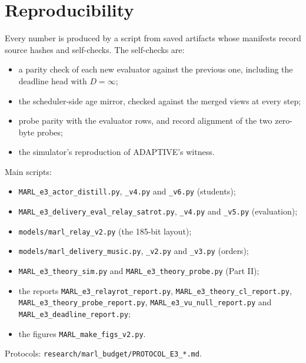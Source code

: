 \documentclass[11pt]{article}
\theoremstyle{definition}
\begin{document}
\section{Reproducibility}
Every number is produced by a script from saved artifacts whose manifests record source hashes and self-checks. The
self-checks are:
\begin{itemize}
\item a parity check of each new evaluator against the previous one, including the deadline head with $D=\infty$;
\item the scheduler-side age mirror, checked against the merged views at every step;
\item probe parity with the evaluator rows, and record alignment of the two zero-byte probes;
\item the simulator's reproduction of ADAPTIVE's witness.
\end{itemize}
Main scripts:
\begin{itemize}
\item \texttt{MARL\_e3\_actor\_distill.py}, \texttt{\_v4.py} and \texttt{\_v6.py} (students);
\item \texttt{MARL\_e3\_delivery\_eval\_relay\_satrot.py}, \texttt{\_v4.py} and \texttt{\_v5.py} (evaluation);
\item \texttt{models/marl\_relay\_v2.py} (the 185-bit layout);
\item \texttt{models/marl\_delivery\_music.py}, \texttt{\_v2.py} and \texttt{\_v3.py} (orders);
\item \texttt{MARL\_e3\_theory\_sim.py} and \texttt{MARL\_e3\_theory\_probe.py} (Part II);
\item the reports \texttt{MARL\_e3\_relayrot\_report.py}, \texttt{MARL\_e3\_theory\_cl\_report.py},
\texttt{MARL\_e3\_theory\_probe\_report.py}, \texttt{MARL\_e3\_vu\_null\_report.py} and
\texttt{MARL\_e3\_deadline\_report.py};
\item the figures \texttt{MARL\_make\_figs\_v2.py}.
\end{itemize}
Protocols: \texttt{research/marl\_budget/PROTOCOL\_E3\_*.md}.

\appendix
\end{document}
